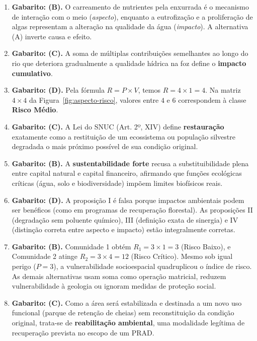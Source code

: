 \begin{boxGabarito}
\begin{enumerate}[leftmargin=1.8em, itemsep=3.5pt, start=11]
  \item \textbf{Gabarito: (B).} O carreamento de nutrientes pela enxurrada é o mecanismo de interação com o meio (\textit{aspecto}), enquanto a eutrofização e a proliferação de algas representam a alteração na qualidade da água (\textit{impacto}). A alternativa (A) inverte causa e efeito.
  \item \textbf{Gabarito: (C).} A soma de múltiplas contribuições semelhantes ao longo do rio que deteriora gradualmente a qualidade hídrica na foz define o \textbf{impacto cumulativo}.
  \item \textbf{Gabarito: (D).} Pela fórmula $R = P \times V$, temos $R = 4 \times 1 = 4$. Na matriz $4 \times 4$ da Figura~\ref{fig:aspecto-risco}, valores entre $4$ e $6$ correspondem à classe \textbf{Risco Médio}.
  \item \textbf{Gabarito: (C).} A Lei do SNUC (Art. 2º, XIV) define \textbf{restauração} exatamente como a restituição de um ecossistema ou população silvestre degradada o mais próximo possível de sua condição original.
  \item \textbf{Gabarito: (B).} A \textbf{sustentabilidade forte} recusa a substituibilidade plena entre capital natural e capital financeiro, afirmando que funções ecológicas críticas (água, solo e biodiversidade) impõem limites biofísicos reais.
  \item \textbf{Gabarito: (D).} A proposição I é falsa porque impactos ambientais podem ser benéficos (como em programas de recuperação florestal). As proposições II (degradação sem poluente químico), III (definição exata de sinergia) e IV (distinção correta entre aspecto e impacto) estão integralmente corretas.
  \item \textbf{Gabarito: (B).} Comunidade 1 obtém $R_1 = 3 \times 1 = 3$ (Risco Baixo), e Comunidade 2 atinge $R_2 = 3 \times 4 = 12$ (Risco Crítico). Mesmo sob igual perigo ($P = 3$), a vulnerabilidade socioespacial quadruplicou o índice de risco. As demais alternativas usam soma como operação matricial, reduzem vulnerabilidade à geologia ou ignoram medidas de proteção social.
  \item \textbf{Gabarito: (C).} Como a área será estabilizada e destinada a um novo uso funcional (parque de retenção de cheias) sem reconstituição da condição original, trata-se de \textbf{reabilitação ambiental}, uma modalidade legítima de recuperação prevista no escopo de um PRAD.
\end{enumerate}
\end{boxGabarito}

